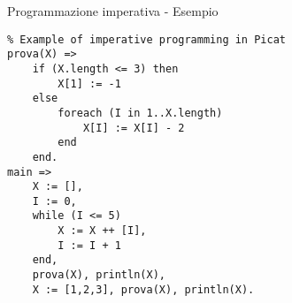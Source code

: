 \iffalse
Qui possiamo vedere un esempio di programma in stile imperativo scritto in PICAT. Il programma inizia dal main con una lista vuota X e un numero I pari a zero. Poi viene fatto un wile inizializzando la lista e incrementando ad ogni ciclo I. Finito il ciclo viene richiamata la funzione prova modifica la lista.
Poi la lista viene riassegnata e ancora modificata con la funzione prova
\fi

\begin{frame}[fragile, shrink=20]{Programmazione imperativa - Esempio}

	\begin{lstlisting}
% Example of imperative programming in Picat
prova(X) =>
	if (X.length <= 3) then
		X[1] := -1
	else
		foreach (I in 1..X.length)
			X[I] := X[I] - 2
		end
	end.
main =>
	X := [],
	I := 0, 
	while (I <= 5)
		X := X ++ [I],
		I := I + 1
	end,
	prova(X), println(X),
	X := [1,2,3], prova(X), println(X).
	\end{lstlisting}
	
\end{frame}
